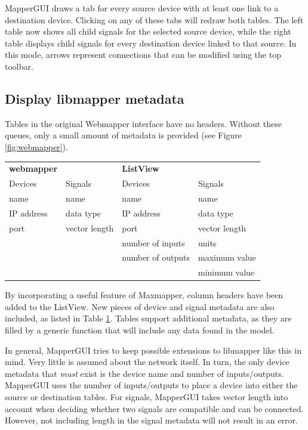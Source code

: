 MapperGUI draws a tab for every source device with at least one link to a destination device. Clicking on any of these tabs will redraw both tables. The left table now shows all child signals for the selected source device, while the right table displays child signals for every destination device linked to that source. In this mode, arrows represent connections that can be modified using the top toolbar.

	
	\subsection{Display libmapper metadata} %
	\label{sub:display_libmapper_metadata}

Tables in the original Webmapper interface have no headers. Without these queues, only a small amount of metadata is provided (see Figure \ref{fig:webmapper}).

\begin{table}
	\centering
	\label{tab:webmapper_list_view_metadata}
		\begin{tabular}{l  l  |  l l }
		\hline\hline
		\textbf{webmapper}&&\textbf{ListView}\\
		Devices&Signals&Devices&Signals\\
		\hline
		name&name&name&name\\
		IP address&data type&IP address&data type\\
		port&vector length&port&vector length\\
		&&number of inputs&units\\
		&&number of outputs&maximum value\\
		&&&minimum value\\
		\end{tabular}
\end{table}

By incorporating a useful feature of Maxmapper, column headers have been added to the ListView. New pieces of device and signal metadata are also included, as listed in Table \ref{tab:webmapper_list_view_metadata}. Tables support additional metadata, as they are filled by a generic function that will include any data found in the model. 

In general, MapperGUI tries to keep possible extensions to libmapper like this in mind. Very little is assumed about the network itself. In turn, the only device metadata that \emph{must} exist is the device name and number of inputs/outputs. MapperGUI uses the number of inputs/outputs to place a device into either the source or destination tables. For signals, MapperGUI takes vector length into account when deciding whether two signals are compatible and can be connected. However, not including length in the signal metadata will not result in an error.
	
